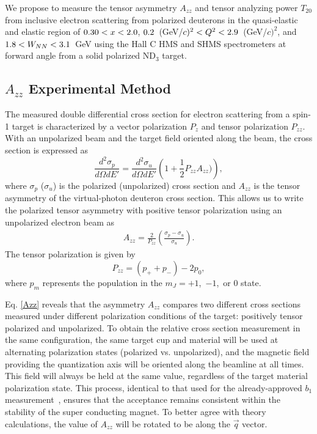 We propose to measure the tensor asymmetry $A_{zz}$ and tensor analyzing power $T_{20}$ from inclusive electron scattering from polarized deuterons in the quasi-elastic and elastic region of $0.30<x<2.0$, $0.2$~(GeV/$c)^2 < Q^2 <2.9$~(GeV/$c)^2$, and $1.8 < W_{NN} < 3.1$~GeV using the Hall C HMS and SHMS spectrometers at forward angle from a solid polarized ND$_3$ target.


\subsection{$A_{zz}$ Experimental Method} %

The measured double differential cross section for electron scattering from a spin-1 target is characterized by a vector polarization $P_{z}$ and tensor polarization $P_{zz}$. With an unpolarized beam and the target field oriented along the beam, the cross section is expressed as~\cite{Leidemann:1991qs}
\begin{equation}
\frac{d^2\sigma_p}{d\Omega dE'}=\frac{d^2\sigma_u}{d\Omega dE'}\left(1+\frac{1}{2}P_{zz}A_{zz}) \right),
\label{eq:one}
\end{equation}
where $\sigma_p$ ($\sigma_u$) is the polarized (unpolarized) cross section and $A_{zz}$ is the
tensor asymmetry of the virtual-photon deuteron cross section.  This allows us to write
the polarized tensor asymmetry with positive tensor polarization using an unpolarized electron beam as
\begin{eqnarray}
\label{Azz}
A_{zz} = \frac{2}{P_{zz}}\left(\frac{\sigma_p - \sigma_u}{\sigma_u}\right).
\end{eqnarray}
The tensor polarization is given by 
\begin{equation}
P_{zz}=(p_++p_-)-2p_0,
\end{equation}
where $p_m$ represents the population in the $m_J=+1$,~$-1$,~or $0$ state.

Eq. \ref{Azz} reveals that the asymmetry $A_{zz}$ compares two different cross sections measured under different polarization conditions of the target: positively tensor polarized and unpolarized.  
To obtain the relative cross section measurement in the same configuration, the same target cup and material will be used at alternating polarization states (polarized vs. unpolarized),  and the magnetic field providing the quantization axis will be oriented along the beamline at all times.
This field will always be held at the same value, regardless of the target material polarization state. 
This process, identical to that used for the already-approved $b_1$ measurement~\cite{b1prop}, ensures that the acceptance remains consistent within the stability of the super conducting magnet.  To better agree with theory calculations, the value of $A_{zz}$ will be rotated to be along the $\vec{q}$ vector.


